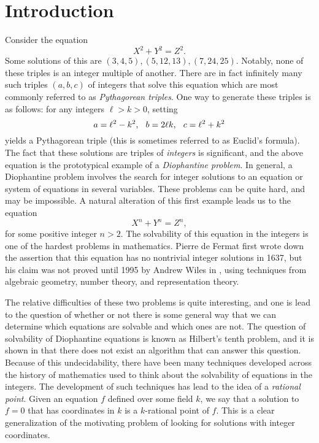 \documentclass[12pt,twoside]{reedthesis}
\theoremstyle{plain}
\theoremstyle{definition}
\theoremstyle{remark}
\begin{document}
\chapter*{Introduction}
Consider the equation
\[
X^2+Y^2=Z^2.
\]
Some solutions of this are $(3,4,5), (5,12,13), (7,24,25)$. Notably, none of these triples is an integer multiple of another. There are in fact infinitely many such triples $(a,b,c)$ of integers that solve this equation which are most commonly referred to as \emph{Pythagorean triples}. One way to generate these triples is as follows: for any integers $\ell>k>0$, setting
\[
a=\ell^2-k^2,\hspace{0.25cm} b=2\ell k,\hspace{0.25cm} c=\ell^2+k^2
\] 
yields a Pythagorean triple (this is sometimes referred to as Euclid's formula). The fact that these solutions are triples of \emph{integers} is significant, and the above equation is the prototypical example of a \emph{Diophantine problem}. In general, a Diophantine problem involves the search for integer solutions to an equation or system of equations in several variables. These problems can be quite hard, and may be impossible. A natural alteration of this first example leads us to the equation
\[
X^n+Y^n=Z^n,
\]
for some positive integer $n>2$. The solvability of this equation in the integers is one of the hardest problems in mathematics. Pierre de Fermat first wrote down the assertion that this equation has no nontrivial integer solutions in 1637, but his claim was not proved until 1995 by Andrew Wiles in \cite{FLT}, using techniques from algebraic geometry, number theory, and representation theory. 

The relative difficulties of these two problems is quite interesting, and one is lead to the question of whether or not there is some general way that we can determine which equations are solvable and which ones are not. The question of solvability of Diophantine equations is known as Hilbert's tenth problem, and it is shown in \cite{hilbert10} that there does not exist an algorithm that can answer this question. Because of this undecidability, there have been many techniques developed across the history of mathematics used to think about the solvability of equations in the integers. The development of such techniques has lead to the idea of a \emph{rational point}. Given an equation $f$ defined over some field $k$, we say that a solution to $f=0$ that has coordinates in $k$ is a $k$-rational point of $f$. This is a clear generalization of the motivating problem of looking for solutions with integer coordinates. 
\end{document}
